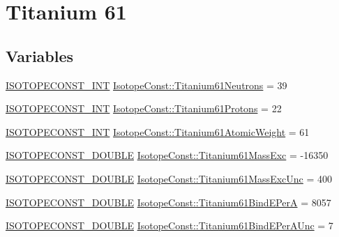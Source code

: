 \hypertarget{group___isotope_const-_titanium-_ti61}{}\section{Titanium 61}
\label{group___isotope_const-_titanium-_ti61}
\subsection*{Variables}
\begin{DoxyCompactItemize}
\item 
\mbox{\hyperlink{group___isotope_const-_macros_ga5f18360b3e99483a35c32d789e62621c}{I\+S\+O\+T\+O\+P\+E\+C\+O\+N\+S\+T\+\_\+\+I\+NT}} \mbox{\hyperlink{group___isotope_const-_titanium-_ti61_gac303179d3be15d44f8e8249d6f48118a}{Isotope\+Const\+::\+Titanium61\+Neutrons}} = 39
\item 
\mbox{\hyperlink{group___isotope_const-_macros_ga5f18360b3e99483a35c32d789e62621c}{I\+S\+O\+T\+O\+P\+E\+C\+O\+N\+S\+T\+\_\+\+I\+NT}} \mbox{\hyperlink{group___isotope_const-_titanium-_ti61_gad724f72420da5d5508da818b6cad2570}{Isotope\+Const\+::\+Titanium61\+Protons}} = 22
\item 
\mbox{\hyperlink{group___isotope_const-_macros_ga5f18360b3e99483a35c32d789e62621c}{I\+S\+O\+T\+O\+P\+E\+C\+O\+N\+S\+T\+\_\+\+I\+NT}} \mbox{\hyperlink{group___isotope_const-_titanium-_ti61_gac57e76afb3949e34e59e985d207a4a86}{Isotope\+Const\+::\+Titanium61\+Atomic\+Weight}} = 61
\item 
\mbox{\hyperlink{group___isotope_const-_macros_ga8f45a7272ce02c0b4c65c44636ed719a}{I\+S\+O\+T\+O\+P\+E\+C\+O\+N\+S\+T\+\_\+\+D\+O\+U\+B\+LE}} \mbox{\hyperlink{group___isotope_const-_titanium-_ti61_ga9bf7c106e9cc7e41170c5edd49c05fd5}{Isotope\+Const\+::\+Titanium61\+Mass\+Exc}} = -\/16350
\item 
\mbox{\hyperlink{group___isotope_const-_macros_ga8f45a7272ce02c0b4c65c44636ed719a}{I\+S\+O\+T\+O\+P\+E\+C\+O\+N\+S\+T\+\_\+\+D\+O\+U\+B\+LE}} \mbox{\hyperlink{group___isotope_const-_titanium-_ti61_ga93a3c5f8c398d027ed30a062e2e225e2}{Isotope\+Const\+::\+Titanium61\+Mass\+Exc\+Unc}} = 400
\item 
\mbox{\hyperlink{group___isotope_const-_macros_ga8f45a7272ce02c0b4c65c44636ed719a}{I\+S\+O\+T\+O\+P\+E\+C\+O\+N\+S\+T\+\_\+\+D\+O\+U\+B\+LE}} \mbox{\hyperlink{group___isotope_const-_titanium-_ti61_gae0fe9b089fbc9d7bd6e26def02c3d5e3}{Isotope\+Const\+::\+Titanium61\+Bind\+E\+PerA}} = 8057
\item 
\mbox{\hyperlink{group___isotope_const-_macros_ga8f45a7272ce02c0b4c65c44636ed719a}{I\+S\+O\+T\+O\+P\+E\+C\+O\+N\+S\+T\+\_\+\+D\+O\+U\+B\+LE}} \mbox{\hyperlink{group___isotope_const-_titanium-_ti61_ga32932161711de5f9cb922b3bf21b4e62}{Isotope\+Const\+::\+Titanium61\+Bind\+E\+Per\+A\+Unc}} = 7

\end{DoxyCompactItemize}
